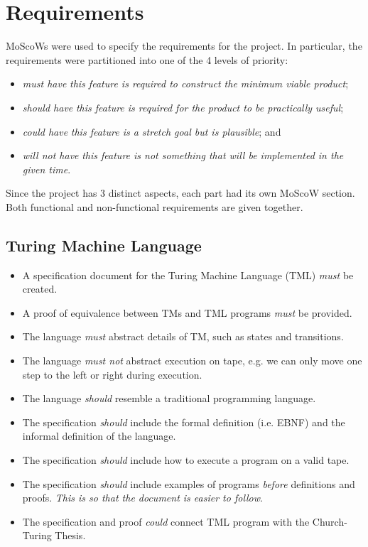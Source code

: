 \chapter{Requirements}

MoScoWs were used to specify the requirements for the project. In particular, the requirements were partitioned into one of the 4 levels of priority:
\begin{itemize}
    \item \emph{must have} \textit{this feature is required to construct the minimum viable product}; 
    \item \emph{should have} \textit{this feature is required for the product to be practically useful};
    \item \emph{could have} \textit{this feature is a stretch goal but is plausible}; and
    \item \emph{will not have} \textit{this feature is not something that will be implemented in the given time}.
\end{itemize} 
Since the project has 3 distinct aspects, each part had its own MoScoW section. Both functional and non-functional requirements are given together.

\section{Turing Machine Language}
\begin{itemize}
    \item A specification document for the Turing Machine Language (TML) \emph{must} be created.
    \item A proof of equivalence between TMs and TML programs \emph{must} be provided. 
    \item The language \emph{must} abstract details of TM, such as states and transitions.
    \item The language \emph{must not} abstract execution on tape, e.g. we can only move one step to the left or right during execution.
    \item The language \emph{should} resemble a traditional programming language.
    \item The specification \emph{should} include the formal definition (i.e. EBNF) and the informal definition of the language.
    \item The specification \emph{should} include how to execute a program on a valid tape.
    \item The specification \emph{should} include examples of programs \textit{before} definitions and proofs. \textit{This is so that the document is easier to follow}.
    \item The specification and proof \emph{could} connect TML program with the Church-Turing Thesis. 
\end{itemize}

